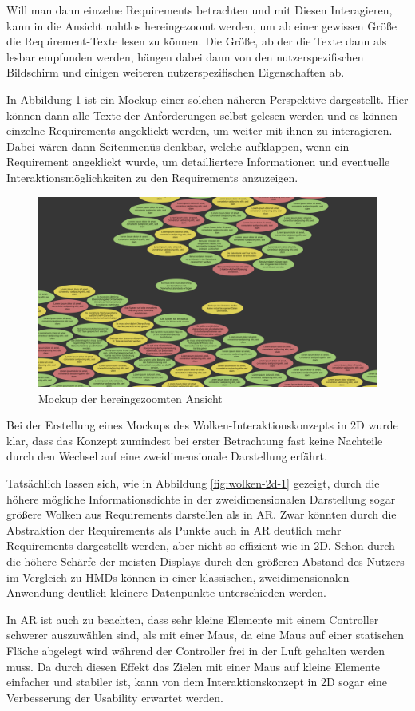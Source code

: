 Will man dann einzelne Requirements betrachten und mit Diesen Interagieren, kann in die Ansicht nahtlos hereingezoomt werden, um ab einer gewissen Größe die Requirement-Texte lesen zu können.
Die Größe, ab der die Texte dann als lesbar empfunden werden, hängen dabei dann von den nutzerspezifischen Bildschirm und einigen weiteren nutzerspezifischen Eigenschaften ab.

In Abbildung \ref{fig:wolken-2d-2} ist ein Mockup einer solchen näheren Perspektive dargestellt.
Hier können dann alle Texte der Anforderungen selbst gelesen werden und es können einzelne Requirements angeklickt werden, um weiter mit ihnen zu interagieren.
Dabei wären dann Seitenmenüs denkbar, welche aufklappen, wenn ein Requirement angeklickt wurde, um detailliertere Informationen und eventuelle Interaktionsmöglichkeiten zu den Requirements anzuzeigen.

\begin{figure}[H]
    \centering
    \includegraphics[width=1\textwidth]{images/FigmaWolkenCloseup.png}
    \caption{Mockup der hereingezoomten Ansicht}
    \label{fig:wolken-2d-2}
\end{figure}

Bei der Erstellung eines Mockups des Wolken-Interaktionskonzepts in 2D wurde klar, dass das Konzept zumindest bei erster Betrachtung fast keine Nachteile durch den Wechsel auf eine zweidimensionale Darstellung erfährt.

Tatsächlich lassen sich, wie in Abbildung \ref{fig:wolken-2d-1} gezeigt, durch die höhere mögliche Informationsdichte in der zweidimensionalen Darstellung sogar größere Wolken aus Requirements darstellen als in AR.
Zwar könnten durch die Abstraktion der Requirements als Punkte auch in AR deutlich mehr Requirements dargestellt werden, aber nicht so effizient wie in 2D.
Schon durch die höhere Schärfe der meisten Displays durch den größeren Abstand des Nutzers im Vergleich zu HMDs können in einer klassischen, zweidimensionalen Anwendung deutlich kleinere Datenpunkte unterschieden werden.

In AR ist auch zu beachten, dass sehr kleine Elemente mit einem Controller schwerer auszuwählen sind, als mit einer Maus, da eine Maus auf einer statischen Fläche abgelegt wird während der Controller frei in der Luft gehalten werden muss.
Da durch diesen Effekt das Zielen mit einer Maus auf kleine Elemente einfacher und stabiler ist, kann von dem Interaktionskonzept in 2D sogar eine Verbesserung der Usability erwartet werden.

